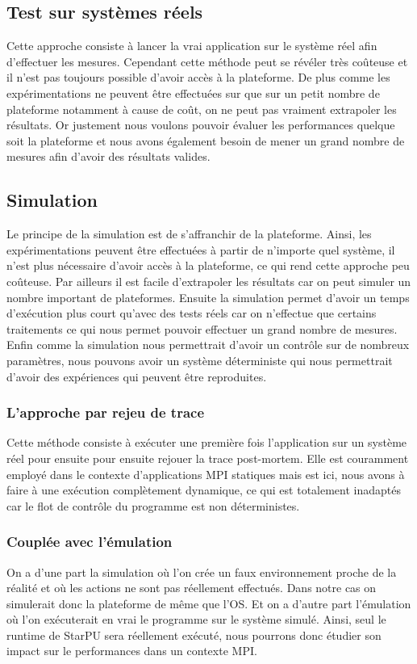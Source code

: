 \documentclass[smallextended]{svjour3}
\begin{document}
\subsection{Test sur systèmes réels}
\label{sec-2-1}
Cette approche consiste à lancer la vrai application sur le système
réel afin d'effectuer les mesures. Cependant cette méthode peut se 
révéler très coûteuse et il n'est pas toujours possible d'avoir
accès à la plateforme. De plus comme les expérimentations ne
peuvent être effectuées sur que sur un petit nombre de plateforme
notamment à cause de coût, on ne peut pas vraiment extrapoler les
résultats. Or justement nous voulons pouvoir évaluer les
performances quelque soit la plateforme et nous avons également
besoin de mener un grand nombre de mesures afin d'avoir des
résultats valides.
\subsection{Simulation}
\label{sec-2-2}
Le principe de la simulation est de s'affranchir de la plateforme.
Ainsi, les expérimentations peuvent être effectuées à partir de
n'importe quel système, il n'est plus nécessaire d'avoir accès à la
plateforme, ce qui rend cette approche peu coûteuse. 
Par ailleurs il est facile d'extrapoler les résultats car on peut
simuler un nombre important de plateformes. Ensuite la simulation
permet d'avoir un temps d'exécution plus court qu'avec des tests
réels car on n'effectue que certains traitements ce qui nous permet
pouvoir effectuer un grand nombre de mesures.  
Enfin comme la simulation nous permettrait d'avoir un contrôle sur
de nombreux paramètres, nous pouvons avoir un système déterministe qui
nous permettrait d'avoir des expériences qui peuvent être reproduites.

\subsubsection{L'approche par rejeu de trace}
\label{sec-2-2-1}
Cette méthode consiste à exécuter une première fois l'application
sur un système réel pour ensuite pour ensuite rejouer la trace
post-mortem. Elle est couramment employé dans le contexte 
d'applications MPI statiques mais est ici, nous avons à faire à une
exécution complètement dynamique, ce qui est totalement inadaptés car
le flot de contrôle du programme est non déterministes. 
\subsubsection{Couplée avec l'émulation}
\label{sec-2-2-2}
On a d'une part la simulation où l'on crée un faux environnement
proche de la réalité et où les actions ne sont pas réellement
effectués. Dans notre cas on simulerait donc la plateforme de même que l'OS.  
Et on a d'autre part l'émulation où l'on exécuterait en vrai le
programme sur le système simulé. Ainsi, seul le runtime de StarPU sera
réellement exécuté\cite{StarPUSG}, nous pourrons donc étudier son impact sur le
performances dans un contexte MPI.
\end{document}
